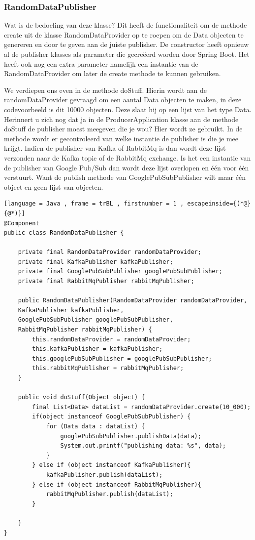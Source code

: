 \subsubsection{RandomDataPublisher}
Wat is de bedoeling van deze klasse? Dit heeft de functionaliteit om de methode create uit de klasse RandomDataProvider op te roepen om de Data objecten te genereren en door te geven aan de juiste publisher. De constructor heeft opnieuw al de publisher klasses als parameter die gecreëerd worden door Spring Boot. Het heeft ook nog een extra parameter namelijk een instantie van de RandomDataProvider om later de create methode te kunnen gebruiken.

We verdiepen ons even in de methode doStuff. Hierin wordt aan de randomDataProvider gevraagd om een aantal Data objecten te maken, in deze codevoorbeeld is dit 10000 objecten. Deze slaat hij op een lijst van het type Data. Herinnert u zich nog dat ja in de ProducerApplication klasse aan de methode doStuff de publisher moest meegeven die je wou? Hier wordt ze gebruikt. In de methode wordt er gecontroleerd van welke instantie de publisher is die je mee krijgt. Indien de publisher van Kafka of RabbitMq is dan wordt deze lijst verzonden naar de Kafka topic of de RabbitMq exchange. Is het een instantie van de publisher van Google Pub/Sub dan wordt deze lijst overlopen en één voor één verstuurt. Want de publish methode van GooglePubSubPublisher wilt maar één object en geen lijst van objecten.

\begin{lstlisting}[language = Java , frame = trBL , firstnumber = 1 , escapeinside={(*@}{@*)}]
@Component
public class RandomDataPublisher {
    
    private final RandomDataProvider randomDataProvider;
    private final KafkaPublisher kafkaPublisher;
    private final GooglePubSubPublisher googlePubSubPublisher;
    private final RabbitMqPublisher rabbitMqPublisher;
    
    public RandomDataPublisher(RandomDataProvider randomDataProvider,
    KafkaPublisher kafkaPublisher,
    GooglePubSubPublisher googlePubSubPublisher,
    RabbitMqPublisher rabbitMqPublisher) {
        this.randomDataProvider = randomDataProvider;
        this.kafkaPublisher = kafkaPublisher;
        this.googlePubSubPublisher = googlePubSubPublisher;
        this.rabbitMqPublisher = rabbitMqPublisher;
    }
    
    public void doStuff(Object object) {
        final List<Data> dataList = randomDataProvider.create(10_000);
        if(object instanceof GooglePubSubPublisher) {
            for (Data data : dataList) {
                googlePubSubPublisher.publishData(data);
                System.out.printf("publishing data: %s", data);
            }
        } else if (object instanceof KafkaPublisher){
            kafkaPublisher.publish(dataList);
        } else if (object instanceof RabbitMqPublisher){
            rabbitMqPublisher.publish(dataList);
        }
        
    }
}
\end{lstlisting}

